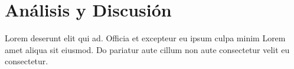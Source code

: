 \section{Análisis y Discusión}\label{sec:analisis-discusion}
Lorem deserunt elit qui ad. Officia et excepteur eu ipsum culpa minim Lorem amet aliqua sit eiusmod. Do pariatur aute cillum non aute consectetur velit eu consectetur.